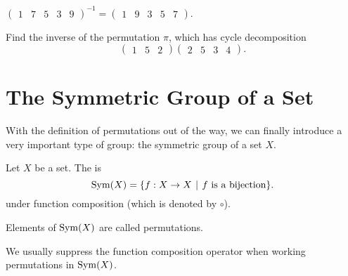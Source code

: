 \begin{example}
    $\begin{pmatrix}1 & 7 & 5 & 3 & 9\end{pmatrix}^{-1} = \begin{pmatrix}1 & 9 & 3 & 5 & 7\end{pmatrix}$.
\end{example}

\begin{exercise}
    Find the inverse of the permutation $\pi$, which has cycle decomposition
    \[
        \begin{pmatrix}1 & 5 & 2\end{pmatrix}\begin{pmatrix}2 & 5 & 3 & 4\end{pmatrix}.
    \]
\end{exercise}

\section{The Symmetric Group of a Set}
With the definition of permutations out of the way, we can finally introduce a very important type of group: the symmetric group of a set $X$.

\begin{definition}
    Let $X$ be a set. The  is
    \[
        \Sym{X} = \{f: X \to X \vert f \text{ is a bijection}\}.
    \]
    under function composition (which is denoted by $\circ$).
\end{definition}
\begin{remark}
    Elements of $\mathrm{Sym}(X)$ are called permutations.
\end{remark}
\begin{remark}
    We usually suppress the function composition operator when working permutations in $\mathrm{Sym}(X)$.
\end{remark}

